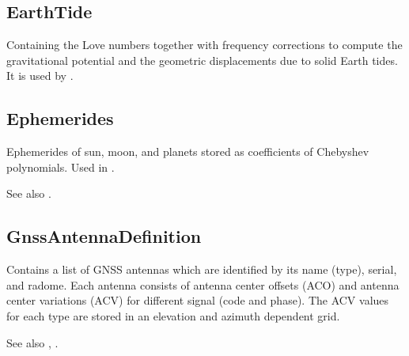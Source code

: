\subsection{EarthTide}\label{general.fileFormat:earthTide}
Containing the Love numbers together with frequency corrections to compute
the gravitational potential and the geometric displacements due to solid Earth tides.
It is used by .


\subsection{Ephemerides}\label{general.fileFormat:ephemerides}
Ephemerides of sun, moon, and planets stored as coefficients of Chebyshev polynomials.
Used in .

See also .


\subsection{GnssAntennaDefinition}\label{general.fileFormat:gnssAntennaDefinition}
Contains a list of GNSS antennas which are identified by its
name (type), serial, and radome. Each antenna consists of
antenna center offsets (ACO) and antenna center variations (ACV)
for different signal  (code and phase).
The ACV values for each type are stored in an elevation and azimuth dependent grid.


See also , .


